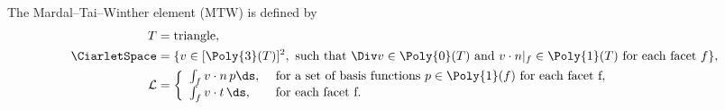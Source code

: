 \begin{definition}
  The Mardal--Tai--Winther element ($\mathrm{MTW}$) is defined by
  \begin{align}
    T &= \mathrm{triangle}{},  \\
    \CiarletSpace &= \{ v \in [\Poly{3}(T)]^2,
                     \text{ such that } \Div v \in \Poly{0}(T)
                     \text{ and } v \cdot n|_{f} \in \Poly{1}(T)
                     \text{ for each facet } f \}, \\
    \mathcal{L} &=
    \left \{
    \begin{array}{ll}
      \int_{f} v \cdot n \, p \ds,
      & \text{ for a set of basis functions } p \in \Poly{1}(f)
      \text{ for each facet } $f$, \\
      \int_{f} v \cdot t \, \ds,
      & \text{ for each facet } $f$. \\
    \end{array}
    \right .
  \end{align}
\end{definition}

